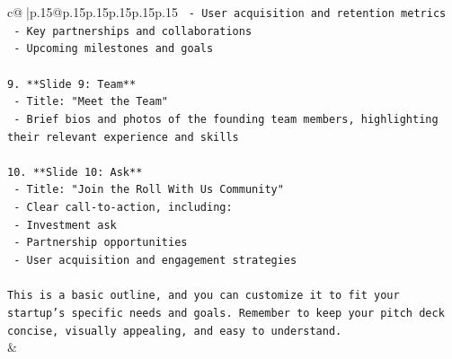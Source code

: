 \documentclass{article}
\begin{document}
{\begin{supertabular}{c@{$\;$}|p{.15\linewidth}@{}p{.15\linewidth}p{.15\linewidth}p{.15\linewidth}p{.15\linewidth}p{.15\linewidth}}
{{{\texttt{     {-} User acquisition and retention metrics} \\
\texttt{     {-} Key partnerships and collaborations} \\
\texttt{     {-} Upcoming milestones and goals} \\
\\ 
\texttt{9. **Slide 9: Team**} \\
\texttt{   {-} Title: "Meet the Team"} \\
\texttt{   {-} Brief bios and photos of the founding team members, highlighting their relevant experience and skills} \\
\\ 
\texttt{10. **Slide 10: Ask**} \\
\texttt{    {-} Title: "Join the Roll With Us Community"} \\
\texttt{    {-} Clear call{-}to{-}action, including:} \\
\texttt{      {-} Investment ask} \\
\texttt{      {-} Partnership opportunities} \\
\texttt{      {-} User acquisition and engagement strategies} \\
\\ 
\texttt{This is a basic outline, and you can customize it to fit your startup's specific needs and goals. Remember to keep your pitch deck concise, visually appealing, and easy to understand.} \\
            }
        }
    }
    & \\ \\


\end{supertabular}}
\end{document}
